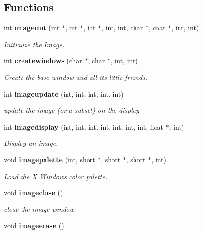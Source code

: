 \subsection*{Functions}
\begin{CompactItemize}
\item 
int {\bf imageinit} (int $\ast$, int $\ast$, int $\ast$, int, int, char $\ast$, char $\ast$, int, int)
\begin{CompactList}\small\item\em Initialize the Image. \item\end{CompactList}\item 
int {\bf createwindows} (char $\ast$, char $\ast$, int, int)
\begin{CompactList}\small\item\em Create the base window and all its little friends. \item\end{CompactList}\item 
int {\bf imageupdate} (int, int, int, int, int)
\begin{CompactList}\small\item\em update the image (or a subset) on the display \item\end{CompactList}\item 
int {\bf imagedisplay} (int, int, int, int, int, int, int, float $\ast$, int)
\begin{CompactList}\small\item\em Display an image. \item\end{CompactList}\item 
void {\bf imagepalette} (int, short $\ast$, short $\ast$, short $\ast$, int)
\begin{CompactList}\small\item\em Load the X Windows color palette. \item\end{CompactList}\item 
void {\bf imageclose} ()\label{xtv_8h_a64}

\begin{CompactList}\small\item\em close the image window \item\end{CompactList}\item 
void {\bf imageerase} ()\label{xtv_8h_a65}


\end{CompactItemize}

